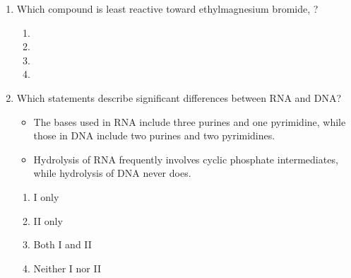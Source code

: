 \documentclass[twocolumn, 10pt]{article}
\begin{document}
\begin{enumerate}
    \item Which compound is least reactive toward ethylmagnesium bromide, ?
    \begin{enumerate}
        \item {}
        \item {}
        \item {}
        \item {}
    \end{enumerate}

    \item Which statements describe significant differences between RNA and DNA?
    \begin{itemize}
        \item[I.] The bases used in RNA include three purines and one pyrimidine, while those in DNA include two purines and two pyrimidines.
        \item[II.] Hydrolysis of RNA frequently involves cyclic phosphate intermediates, while hydrolysis of DNA never does.
    \end{itemize}
    \begin{enumerate}
        \item I only
        \item II only
        \item Both I and II
        \item Neither I nor II
    \end{enumerate}

\end{enumerate}
\end{document}
